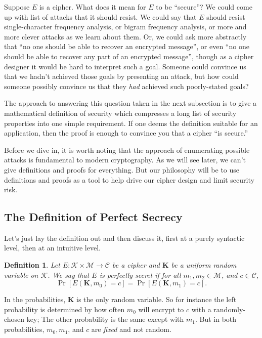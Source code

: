 \documentclass[11pt]{article}
\newtheorem{definition}{Definition}
\newcommand{\msgs}{\mathcal{M}}
\newcommand{\ctxts}{\mathcal{C}}
\newcommand{\keys}{\mathcal{K}}
\newcommand{\enc}{E}
\newcommand{\bK}{\mathbf{K}}
\begin{document}
Suppose $E$ is a cipher. What does it mean for $E$ to be ``secure''? We could come
up with list of attacks that it should resist. We could say that $E$ should
resist single-character frequency analysis, or bigram frequency analysis, or
more and more clever attacks as we learn about them.  Or, we could ask
more abstractly that ``no one should be able to recover an encrypted message'',
or even ``no one should be able to recover any part of an encrypted message'',
though as a cipher designer it would be hard to interpret such a goal. Someone
could convince us that we hadn't achieved those goals by presenting an attack,
but how could someone possibly convince us that they \emph{had} achieved 
such poorly-stated goals? 

The approach to answering this question taken in the next subsection is to give
a mathematical definition of security which compresses a long list of
security properties into one simple requirement. If one deems the
definition suitable for an application, then the proof is enough to convince
you that a cipher ``is secure.''

Before we dive in, it is worth noting that the approach of enumerating possible
attacks is fundamental to modern cryptography. As we will see later, we can't
give definitions and proofs for everything. But our philosophy will be to use
definitions and proofs as a tool to help drive our cipher design and limit
security risk.

\subsection{The Definition of Perfect Secrecy}

Let's just lay the definition out and then discuss it, first at a purely
syntactic level, then at an intuitive level.
\begin{definition}Let $\enc : \keys\times\msgs \to \ctxts$ be a cipher and
    $\bK$ be a uniform random variable on $\keys$.  We say that $\enc$ is
    \emph{perfectly secret} if for all $m_1,m_2\in\msgs$, and $c\in\ctxts$,
    \[
        \Pr[\enc(\bK,m_0) = c] = \Pr[\enc(\bK,m_1) = c].
    \]
\end{definition}
In the probabilities, $\bK$ is the only random variable. So for instance
the left probability is determined by how often $m_0$ will encrypt to
$c$ with a randomly-chosen key; The other probability is the same except
with $m_1$. But in both probabilities, $m_0,m_1$, and $c$ are \emph{fixed}
and not random.
\end{document}
